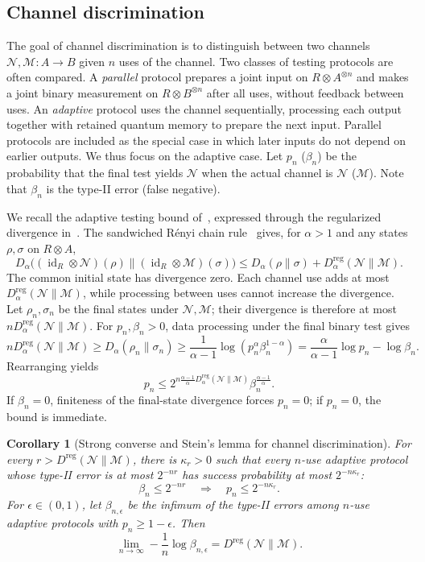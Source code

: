 \documentclass[11pt,letterpaper]{article}
\numberwithin{equation}{section}
\newtheorem{corollary}[theorem]{Corollary}
\newcommand{\N}{\mathcal N}
\newcommand{\M}{\mathcal M}
\newcommand{\id}{\operatorname{id}}
\newcommand{\reg}{\mathrm{reg}}
\newcommand{\Dt}{D}
\begin{document}
\subsection{Channel discrimination}
The goal of channel discrimination is to distinguish between two channels $\N,\M: A\to B$ given $n$ uses of the channel.
Two classes of testing protocols are often compared. A \emph{parallel} protocol prepares a joint input on $R\otimes A^{\otimes n}$ and makes a joint binary measurement on $R\otimes B^{\otimes n}$ after all uses, without feedback between uses. An \emph{adaptive} protocol uses the channel sequentially, processing each output together with retained quantum memory to prepare the next input. Parallel protocols are included as the special case in which later inputs do not depend on earlier outputs. We thus focus on the adaptive case. Let $p_n$ ($\beta_n$) be the probability that the final test yields $\N$ when the actual channel is $\N$ ($\M$). Note that $\beta_n$ is the type-II error (false negative).

We recall the adaptive testing bound of~\cite{WBHK}, expressed through the regularized divergence in~\cite{FF}. The sandwiched R\'enyi chain rule~\cite{FF} gives, for $\alpha>1$ and any states $\rho,\sigma$ on $R\otimes A$,
\[
 \Dt_\alpha\bigl((\id_R\otimes\N)(\rho)\|
                       (\id_R\otimes\M)(\sigma)\bigr)
 \le \Dt_\alpha(\rho\|\sigma)+\Dt_\alpha^{\reg}(\N\|\M).
\]
The common initial state has divergence zero. Each channel use adds at most $\Dt_\alpha^{\reg}(\N\|\M)$, while processing between uses cannot increase the divergence. Let $\rho_n,\sigma_n$ be the final states under $\N,\M$; their divergence is therefore at most $n\Dt_\alpha^{\reg}(\N\|\M)$. For $p_n,\beta_n>0$, data processing under the final binary test gives
\[
 n\Dt_\alpha^{\reg}(\N\|\M)
 \ge\Dt_\alpha(\rho_n\|\sigma_n)
 \ge\frac1{\alpha-1}\log(p_n^\alpha\beta_n^{1-\alpha})
 =\frac\alpha{\alpha-1}\log p_n-\log\beta_n.
\]
Rearranging yields
\begin{equation}\label{eq:app-testing}
 p_n\le
 2^{n\frac{\alpha-1}{\alpha}\Dt_\alpha^{\reg}(\N\|\M)}
 \beta_n^{\frac{\alpha-1}{\alpha}}.
\end{equation}
If $\beta_n=0$, finiteness of the final-state divergence forces $p_n=0$; if $p_n=0$, the bound is immediate.

\begin{corollary}[Strong converse and Stein's lemma for channel discrimination]\label{cor:discrimination}
For every $r>D^{\reg}(\N\|\M)$, there is $\kappa_r>0$ such that every $n$-use adaptive protocol whose type-II error is at most $2^{-nr}$ has success probability at most $2^{-n\kappa_r}$:
\begin{equation}\label{eq:SC}
 \beta_n\le2^{-nr}\quad\Longrightarrow\quad p_n\le2^{-n\kappa_r}.
\end{equation}
For $\epsilon\in(0,1)$, let $\beta_{n,\epsilon}$ be the infimum of the type-II errors among $n$-use adaptive protocols with $p_n\ge1-\epsilon$. Then
\begin{equation}\label{eq:app-stein}
 \lim_{n\to\infty}-\frac1n\log\beta_{n,\epsilon}
 =D^{\reg}(\N\|\M).
\end{equation}
\end{corollary}
\end{document}
